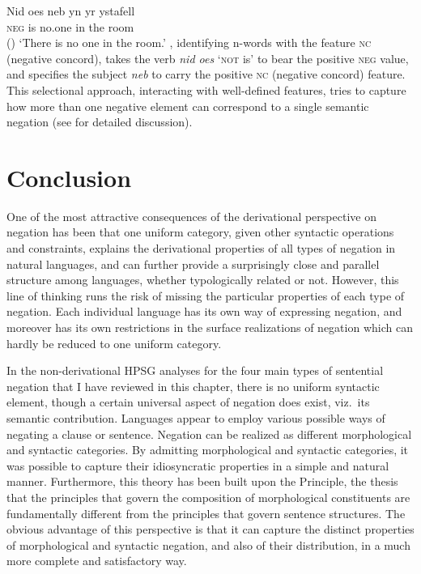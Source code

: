 \documentclass[output=paper,biblatex,babelshorthands,newtxmath,draftmode,colorlinks,citecolor=brown]{langscibook}
\begin{document}
\begin{exe}
\begin{xlist}
\begin{exe}
\begin{xlist}
\ea
\gll Nid         oes neb yn yr ystafell\\
\textsc{neg}    is no.one in the room\\\hfill()
\glt `There is no one in the room.'
\z
\noindent \citet{BJ:00}, identifying n-words with the feature
\textsc{nc} (negative
concord),  takes the verb \emph{nid oes} `\textsc{not} is' to bear the positive \textsc{neg} value,
and specifies the subject \emph{neb} to carry the positive \textsc{nc} (negative
concord) feature. This selectional approach, interacting with
well-defined features, tries to capture how more than one
negative element can correspond to a single semantic negation (see
\citealt{BJ:00} for detailed discussion).



\section{Conclusion}

One of the most attractive consequences of the derivational perspective on negation has been that
one uniform category, given other syntactic operations and constraints, explains the derivational
properties of all types of negation in natural languages, and can further provide a surprisingly
close and parallel structure among languages, whether typologically related or not. However, this
line of thinking runs the risk of missing the particular properties of each type of negation. Each
individual language has its own way of expressing negation, and moreover has its own restrictions in
the surface realizations of negation which can hardly be reduced to one uniform category.


In the non-derivational HPSG analyses for the four main types of sentential negation that I have
reviewed in this chapter, there is no uniform syntactic element, though a certain universal aspect
of negation does exist, viz.\ its semantic contribution.  Languages appear to employ various
possible ways of negating a clause or sentence. Negation can be realized as different morphological
and syntactic categories.  By admitting morphological and syntactic categories, it was possible to capture their idiosyncratic properties in a simple and natural manner. Furthermore, this theory has
been built upon the  Principle, the thesis that the principles that govern the
composition of morphological constituents are fundamentally different from the principles that
govern sentence structures. The obvious advantage of this perspective is that it can capture the
distinct properties of morphological and syntactic negation, and also of their distribution, in a
much more complete and satisfactory way.


\end{xlist}
\end{exe}
\end{xlist}
\end{exe}
\end{document}

